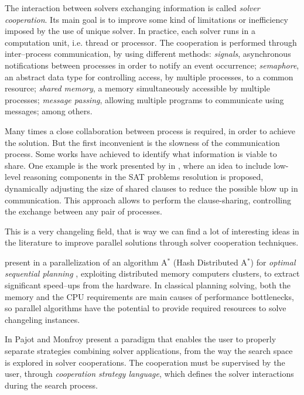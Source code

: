 The interaction between solvers exchanging information is called {\it solver cooperation}. %
Its main goal is to improve some kind of limitations or inefficiency imposed by the use of unique solver. In practice, each solver runs in a computation unit, i.e. thread or processor. The cooperation is performed through inter--process communication, by using different methods: \textit{signals}, asynchronous notifications between processes in order to notify an event occurrence; \textit{semaphore}, an abstract data type for controlling access, by multiple processes, to a common resource; \textit{shared memory}, a memory simultaneously accessible by multiple processes; \textit{message passing}, allowing multiple programs to communicate using messages; among others.

Many times a close collaboration between process is required, in order to achieve the solution. But the first inconvenient is the slowness of the communication process. Some works have achieved to identify what information is viable to share. One example is the work presented by  in \cite{Hamadi2012}, where an idea to include low-level reasoning components in the SAT problems resolution is proposed, dynamically adjusting the size of shared clauses to reduce the possible blow up in communication. This approach allows to perform the clause-sharing, controlling the exchange between any pair of processes.

This is a very changeling field, that is way we can find a lot of interesting ideas in the literature to improve parallel solutions through solver cooperation techniques. 

 present in \cite{Kishimoto2009} a parallelization of an algorithm A$^*$ (Hash Distributed A$^*$) for \textit{optimal sequential planning} \cite{Schmegner2004}, exploiting distributed memory computers clusters, to extract significant speed--ups from the hardware. In classical planning solving, both the memory and the CPU requirements are main causes of performance bottlenecks, so parallel algorithms have the potential to provide required resources to solve changeling instances. 

In \cite{Pajot2003} Pajot and Monfroy present a paradigm that enables the user to properly separate strategies combining solver applications, from the way the search space is explored in solver cooperations. The cooperation must be supervised by the user, through {\it cooperation strategy language}, which defines the solver interactions during the search process.

